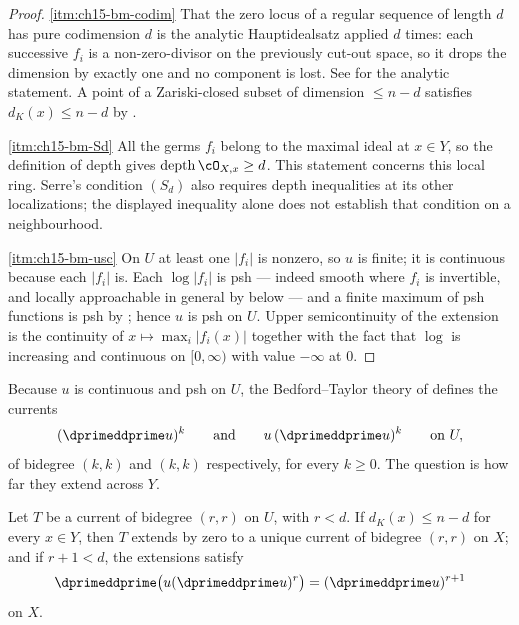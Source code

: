 \begin{proof}
\cref{itm:ch15-bm-codim}
That the zero locus of a regular sequence of length $d$ has pure codimension
$d$ is the analytic Hauptidealsatz applied $d$ times: each successive
$f_i$ is a non-zero-divisor on the previously cut-out space, so it drops the
dimension by exactly one and no component is lost.  See
\cite[Lemma~11.5.2]{CLD25} for the analytic statement.  A point of a
Zariski-closed subset of dimension $\le n-d$ satisfies $d_K(x)\le n-d$ by
.

\cref{itm:ch15-bm-Sd}
All the germs $f_i$ belong to the maximal ideal at $x\in Y$, so the
definition of depth gives $\operatorname{depth}\cO_{X,x}\ge d$.
This statement concerns this local ring.  Serre's condition $(S_d)$ also
requires depth inequalities at its other localizations; the displayed
inequality alone does not establish that condition on a neighbourhood.

\cref{itm:ch15-bm-usc}
On $U$ at least one $|f_i|$ is nonzero, so $u$ is finite; it is continuous
because each $|f_i|$ is.  Each $\log|f_i|$ is psh --- indeed smooth where
$f_i$ is invertible, and locally approachable in general by
 below --- and a finite maximum of psh
functions is psh by ; hence $u$ is psh on $U$.
Upper semicontinuity of the extension is the continuity of
$x\mapsto\max_i|f_i(x)|$ together with the fact that $\log$ is increasing and
continuous on $[0,\infty)$ with value $-\infty$ at $0$.
\end{proof}

Because $u$ is continuous and psh on $U$, the Bedford--Taylor theory of
 defines the currents
\[
 (\dprimeddprime u)^k
 \qquad\text{and}\qquad
 u\,(\dprimeddprime u)^k
 \qquad\text{on }U,
\]
of bidegree $(k,k)$ and $(k,k)$ respectively, for every $k\ge0$.  The
question is how far they extend across $Y$.

\begin{lemma}
\label{lem:ch15-bm-extension}
Let $T$ be a current of bidegree $(r,r)$ on $U$, with $r<d$.  If
$d_K(x)\le n-d$ for every $x\in Y$, then $T$ extends by zero to a unique
current of bidegree $(r,r)$ on $X$; and if $r+1<d$, the extensions satisfy
\[
 \dprimeddprime\bigl(u(\dprimeddprime u)^r\bigr)=(\dprimeddprime u)^{r+1}
\]
on $X$.
\end{lemma}


